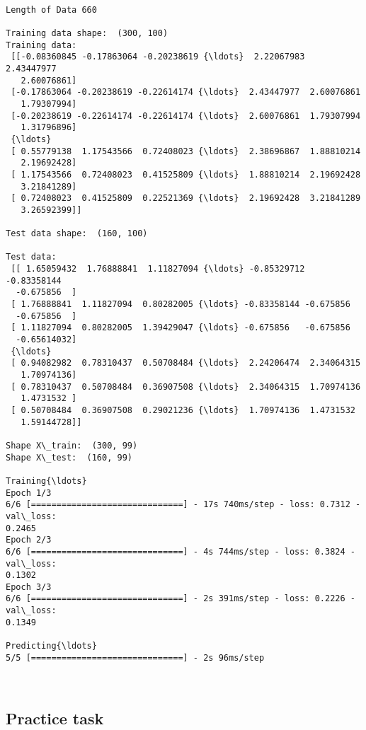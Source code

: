 \documentclass[11pt]{article}
\begin{document}
    \begin{Verbatim}[commandchars=\\\{\}]

Length of Data 660

Training data shape:  (300, 100)
Training data:
 [[-0.08360845 -0.17863064 -0.20238619 {\ldots}  2.22067983  2.43447977
   2.60076861]
 [-0.17863064 -0.20238619 -0.22614174 {\ldots}  2.43447977  2.60076861
   1.79307994]
 [-0.20238619 -0.22614174 -0.22614174 {\ldots}  2.60076861  1.79307994
   1.31796896]
 {\ldots}
 [ 0.55779138  1.17543566  0.72408023 {\ldots}  2.38696867  1.88810214
   2.19692428]
 [ 1.17543566  0.72408023  0.41525809 {\ldots}  1.88810214  2.19692428
   3.21841289]
 [ 0.72408023  0.41525809  0.22521369 {\ldots}  2.19692428  3.21841289
   3.26592399]]

Test data shape:  (160, 100)

Test data:
 [[ 1.65059432  1.76888841  1.11827094 {\ldots} -0.85329712 -0.83358144
  -0.675856  ]
 [ 1.76888841  1.11827094  0.80282005 {\ldots} -0.83358144 -0.675856
  -0.675856  ]
 [ 1.11827094  0.80282005  1.39429047 {\ldots} -0.675856   -0.675856
  -0.65614032]
 {\ldots}
 [ 0.94082982  0.78310437  0.50708484 {\ldots}  2.24206474  2.34064315
   1.70974136]
 [ 0.78310437  0.50708484  0.36907508 {\ldots}  2.34064315  1.70974136
   1.4731532 ]
 [ 0.50708484  0.36907508  0.29021236 {\ldots}  1.70974136  1.4731532
   1.59144728]]

Shape X\_train:  (300, 99)
Shape X\_test:  (160, 99)

Training{\ldots}
Epoch 1/3
6/6 [==============================] - 17s 740ms/step - loss: 0.7312 - val\_loss:
0.2465
Epoch 2/3
6/6 [==============================] - 4s 744ms/step - loss: 0.3824 - val\_loss:
0.1302
Epoch 3/3
6/6 [==============================] - 2s 391ms/step - loss: 0.2226 - val\_loss:
0.1349

Predicting{\ldots}
5/5 [==============================] - 2s 96ms/step
    \end{Verbatim}

    \begin{center}
    \end{center}
    { \hspace*{\fill} \\}
    
    \hypertarget{practice-task}{%
\subsection{Practice task}\label{practice-task}}
\end{document}
